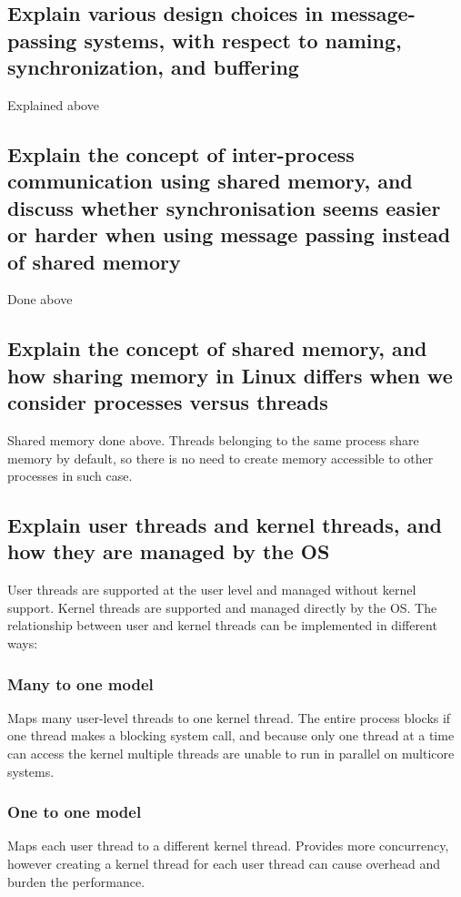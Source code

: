 \documentclass{article}
\begin{document}
\subsection{Explain various design choices in message-passing systems, with respect to naming, synchronization, and buffering}
Explained above

\subsection{Explain the concept of inter-process communication using shared memory, and discuss whether synchronisation seems easier or harder when using message passing instead of shared memory}
Done above

\subsection{Explain the concept of shared memory, and how sharing memory in Linux differs when we consider processes versus threads}
Shared memory done above. Threads belonging to the same process share memory by default, so there is no need to create memory accessible to other processes in such case.

\subsection{Explain user threads and kernel threads, and how they are managed by the OS}
User threads are supported at the user level and managed without kernel support. Kernel threads are supported and managed directly by the OS. The relationship between user and kernel threads can be implemented in different ways:

\subsubsection{Many to one model}
Maps many user-level threads to one kernel thread. The entire process blocks if one thread makes a blocking system call, and because only one thread at a time can access the kernel multiple threads are unable to run in parallel on multicore systems.

\subsubsection{One to one model}
Maps each user thread to a different kernel thread. Provides more concurrency, however creating a kernel thread for each user thread can cause overhead and burden the performance.
\end{document}
